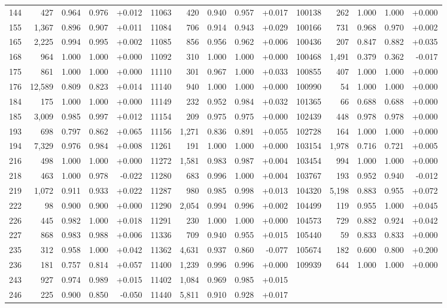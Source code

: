 \begin{longtable}{@{}rrrrr@{\hspace{1.5em}}rrrrr@{\hspace{1.5em}}rrrrr@{}}
144 & 427 & 0.964 & 0.976 & +0.012 & 11063 & 420 & 0.940 & 0.957 & +0.017 & 100138 & 262 & 1.000 & 1.000 & +0.000\\
155 & 1,367 & 0.896 & 0.907 & +0.011 & 11084 & 706 & 0.914 & 0.943 & +0.029 & 100166 & 731 & 0.968 & 0.970 & +0.002\\
165 & 2,225 & 0.994 & 0.995 & +0.002 & 11085 & 856 & 0.956 & 0.962 & +0.006 & 100436 & 207 & 0.847 & 0.882 & +0.035\\
168 & 964 & 1.000 & 1.000 & +0.000 & 11092 & 310 & 1.000 & 1.000 & +0.000 & 100468 & 1,491 & 0.379 & 0.362 & -0.017\\
175 & 861 & 1.000 & 1.000 & +0.000 & 11110 & 301 & 0.967 & 1.000 & +0.033 & 100855 & 407 & 1.000 & 1.000 & +0.000\\
176 & 12,589 & 0.809 & 0.823 & +0.014 & 11140 & 940 & 1.000 & 1.000 & +0.000 & 100990 & 54 & 1.000 & 1.000 & +0.000\\
184 & 175 & 1.000 & 1.000 & +0.000 & 11149 & 232 & 0.952 & 0.984 & +0.032 & 101365 & 66 & 0.688 & 0.688 & +0.000\\
185 & 3,009 & 0.985 & 0.997 & +0.012 & 11154 & 209 & 0.975 & 0.975 & +0.000 & 102439 & 448 & 0.978 & 0.978 & +0.000\\
193 & 698 & 0.797 & 0.862 & +0.065 & 11156 & 1,271 & 0.836 & 0.891 & +0.055 & 102728 & 164 & 1.000 & 1.000 & +0.000\\
194 & 7,329 & 0.976 & 0.984 & +0.008 & 11261 & 191 & 1.000 & 1.000 & +0.000 & 103154 & 1,978 & 0.716 & 0.721 & +0.005\\
216 & 498 & 1.000 & 1.000 & +0.000 & 11272 & 1,581 & 0.983 & 0.987 & +0.004 & 103454 & 994 & 1.000 & 1.000 & +0.000\\
218 & 463 & 1.000 & 0.978 & -0.022 & 11280 & 683 & 0.996 & 1.000 & +0.004 & 103767 & 193 & 0.952 & 0.940 & -0.012\\
219 & 1,072 & 0.911 & 0.933 & +0.022 & 11287 & 980 & 0.985 & 0.998 & +0.013 & 104320 & 5,198 & 0.883 & 0.955 & +0.072\\
222 & 98 & 0.900 & 0.900 & +0.000 & 11290 & 2,054 & 0.994 & 0.996 & +0.002 & 104499 & 119 & 0.955 & 1.000 & +0.045\\
226 & 445 & 0.982 & 1.000 & +0.018 & 11291 & 230 & 1.000 & 1.000 & +0.000 & 104573 & 729 & 0.882 & 0.924 & +0.042\\
227 & 868 & 0.983 & 0.988 & +0.006 & 11336 & 709 & 0.940 & 0.955 & +0.015 & 105440 & 59 & 0.833 & 0.833 & +0.000\\
235 & 312 & 0.958 & 1.000 & +0.042 & 11362 & 4,631 & 0.937 & 0.860 & -0.077 & 105674 & 182 & 0.600 & 0.800 & +0.200\\
236 & 181 & 0.757 & 0.814 & +0.057 & 11400 & 1,239 & 0.996 & 0.996 & +0.000 & 109939 & 644 & 1.000 & 1.000 & +0.000\\
243 & 927 & 0.974 & 0.989 & +0.015 & 11402 & 1,084 & 0.969 & 0.985 & +0.015 &  &  &  &  & \\
246 & 225 & 0.900 & 0.850 & -0.050 & 11440 & 5,811 & 0.910 & 0.928 & +0.017 &  &  &  &  & \\
\end{longtable}
